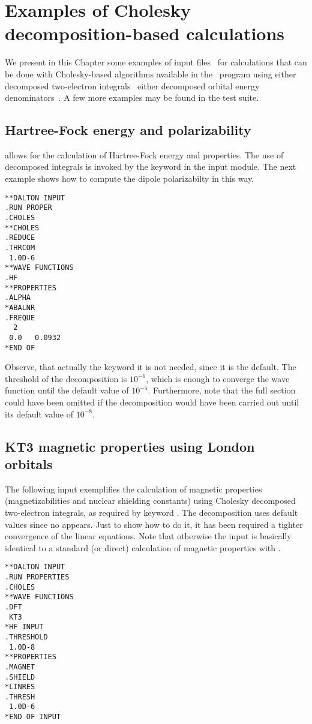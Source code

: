 \chapter{Examples of Cholesky decomposition-based calculations}
\label{ch:choexamples}

We present in this Chapter some examples of input files 
\dalinp\ for calculations that can be done
with Cholesky-based algorithms available in the \dalton\ program 
using either decomposed two-electron 
integrals~\cite{choint,chorsp,choexci} either decomposed orbital 
energy denominators~\cite{jcp_chopt,ijqc_chopt}.
A few more examples may be found in the test suite. 


\section{Hartree-Fock energy and polarizability}
%
{\choles}  allows for the calculation of Hartree-Fock energy
and properties. The use of decomposed integrals is invoked by 
the keyword  in the  input module. The
next example shows how to compute the dipole polarizabilty in this
way. 
%
\begin{verbatim}
**DALTON INPUT
.RUN PROPER
.CHOLES
**CHOLES
.REDUCE
.THRCOM
 1.0D-6
**WAVE FUNCTIONS
.HF
**PROPERTIES
.ALPHA
*ABALNR
.FREQUE
  2
 0.0   0.0932
*END OF
\end{verbatim}
Observe, that actually the keyword  it is not needed, since it is
the default. The threshold of the decomposition is $10^{-6}$, which is enough to 
converge the wave function until the default value of $10^{-5}$. Furthermore,
note that the full section  could have been omitted if the
decomposition would have been carried out until its default value of $10^{-8}$.

\section{KT3 magnetic properties using London orbitals}

The following input exemplifies the calculation of magnetic properties 
(magnetizabilities and nuclear shielding constants) using Cholesky
decomposed two-electron integrals, as required by keyword .
The decomposition uses default values since no  appears.
Just to show how to do it, it has been required a tighter convergence
of the linear equations.  Note that otherwise the input is basically identical 
to a standard (or direct) calculation of magnetic properties with {\dalton}.
\begin{verbatim}
**DALTON INPUT
.RUN PROPERTIES
.CHOLES
**WAVE FUNCTIONS
.DFT
 KT3
*HF INPUT
.THRESHOLD
 1.0D-8
**PROPERTIES
.MAGNET
.SHIELD
*LINRES
.THRESH
 1.0D-6
*END OF INPUT
\end{verbatim}


